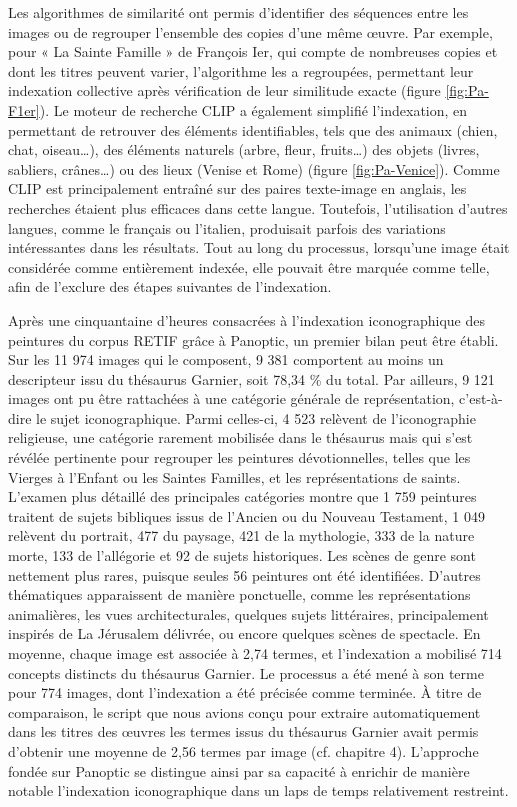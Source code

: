 Les algorithmes de similarité ont permis d’identifier des séquences entre les images ou de regrouper l’ensemble des copies d’une même œuvre. Par exemple, pour « La Sainte Famille » de François Ier, qui compte de nombreuses copies et dont les titres peuvent varier, l’algorithme les a regroupées, permettant leur indexation collective après vérification de leur similitude exacte (figure \ref{fig:Pa-F1er}). Le moteur de recherche CLIP a également simplifié l’indexation, en permettant de retrouver des éléments identifiables, tels que des animaux (chien, chat, oiseau…), des éléments naturels (arbre, fleur, fruits…) des objets (livres, sabliers, crânes…) ou des lieux (Venise et Rome) (figure \ref{fig:Pa-Venice}). Comme CLIP est principalement entraîné sur des paires texte-image en anglais, les recherches étaient plus efficaces dans cette langue. Toutefois, l’utilisation d’autres langues, comme le français ou l’italien, produisait parfois des variations intéressantes dans les résultats. Tout au long du processus, lorsqu’une image était considérée comme entièrement indexée, elle pouvait être marquée comme telle, afin de l’exclure des étapes suivantes de l’indexation.

Après une cinquantaine d’heures consacrées à l’indexation iconographique des peintures du corpus RETIF grâce à Panoptic, un premier bilan peut être établi. Sur les 11 974 images qui le composent, 9 381 comportent au moins un descripteur issu du thésaurus Garnier, soit 78,34 \% du total. Par ailleurs, 9 121 images ont pu être rattachées à une catégorie générale de représentation, c’est-à-dire le sujet iconographique. Parmi celles-ci, 4 523 relèvent de l’iconographie religieuse, une catégorie rarement mobilisée dans le thésaurus mais qui s’est révélée pertinente pour regrouper les peintures dévotionnelles, telles que les Vierges à l’Enfant ou les Saintes Familles, et les représentations de saints. L’examen plus détaillé des principales catégories montre que 1 759 peintures traitent de sujets bibliques issus de l’Ancien ou du Nouveau Testament, 1 049 relèvent du portrait, 477 du paysage, 421 de la mythologie, 333 de la nature morte, 133 de l’allégorie et 92 de sujets historiques. Les scènes de genre sont nettement plus rares, puisque seules 56 peintures ont été identifiées. D’autres thématiques apparaissent de manière ponctuelle, comme les représentations animalières, les vues architecturales, quelques sujets littéraires, principalement inspirés de La Jérusalem délivrée, ou encore quelques scènes de spectacle. En moyenne, chaque image est associée à 2,74 termes, et l’indexation a mobilisé 714 concepts distincts du thésaurus Garnier. Le processus a été mené à son terme pour 774 images, dont l’indexation a été précisée comme terminée. À titre de comparaison, le script que nous avions conçu pour extraire automatiquement dans les titres des œuvres les termes issus du thésaurus Garnier avait permis d’obtenir une moyenne de 2,56 termes par image (cf. chapitre 4). L’approche fondée sur Panoptic se distingue ainsi par sa capacité à enrichir de manière notable l’indexation iconographique dans un laps de temps relativement restreint.

